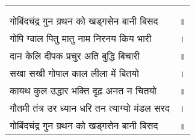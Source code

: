 {
{\bfseries
\setlength{\mylenone}{0pt}
\settowidth{\mylentwo}{}
\setlength{\mylenone}{\maxof{\mylenone}{\mylentwo}}
\settowidth{\mylentwo}{गोबिंदचंद्र गुन ग्रथन को खड्गसेन बानी बिसद}
\setlength{\mylenone}{\maxof{\mylenone}{\mylentwo}}
\settowidth{\mylentwo}{गोपि ग्वाल पितु मातु नाम निरनय किय भारी}
\setlength{\mylenone}{\maxof{\mylenone}{\mylentwo}}
\settowidth{\mylentwo}{दान केलि दीपक प्रचुर अति बुद्धि बिचारी}
\setlength{\mylenone}{\maxof{\mylenone}{\mylentwo}}
\settowidth{\mylentwo}{सखा सखी गोपाल काल लीला में बितयो}
\setlength{\mylenone}{\maxof{\mylenone}{\mylentwo}}
\settowidth{\mylentwo}{कायथ कुल उद्धार भक्ति दृढ़ अनत न चितयो}
\setlength{\mylenone}{\maxof{\mylenone}{\mylentwo}}
\settowidth{\mylentwo}{गौतमी तंत्र उर ध्यान धरि तन त्याग्यो मंडल सरद}
\setlength{\mylenone}{\maxof{\mylenone}{\mylentwo}}
\settowidth{\mylentwo}{गोबिंदचंद्र गुन ग्रथन को खड्गसेन बानी बिसद}
\setlength{\mylenone}{\maxof{\mylenone}{\mylentwo}}
\setlength{\mylentwo}{\baselineskip}
\setlength{\mylenone}{\mylenone + 1pt}
\begin{longtable}[l]{@{\hspace*{\mylen}}>{\setlength\parfillskip{0pt}}p{\mylenone}@{}@{}l@{}}
 & \\[-\the\mylentwo]
\centering{॥ १६१ \hspace*{-1.5mm}॥} & \\ \nopagebreak
गोबिंदचंद्र गुन ग्रथन को खड्गसेन बानी बिसद & ॥\\
गोपि ग्वाल पितु मातु नाम निरनय किय भारी & ।\\ \nopagebreak
दान केलि दीपक प्रचुर अति बुद्धि बिचारी & ॥\\
सखा सखी गोपाल काल लीला में बितयो & ।\\ \nopagebreak
कायथ कुल उद्धार भक्ति दृढ़ अनत न चितयो & ॥\\
गौतमी तंत्र उर ध्यान धरि तन त्याग्यो मंडल सरद & ।\\ \nopagebreak
गोबिंदचंद्र गुन ग्रथन को खड्गसेन बानी बिसद & ॥
\end{longtable}
}
}
